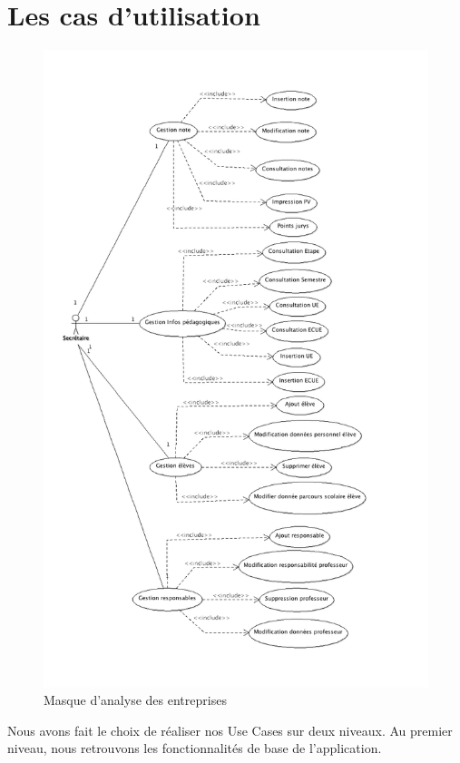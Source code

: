 \documentclass[letter, 12pt] {article}
\begin{document}
	\section{Les cas d'utilisation}
	
	\begin{figure}[htbp]
		\centering
			\includegraphics[scale = 0.5]{../Use_Case/Diagramme_Use_Case.png}
		\caption{Masque d'analyse des entreprises}
	\end{figure}
	
	\newpage
	
	Nous avons fait le choix de réaliser nos Use Cases sur deux niveaux. Au premier niveau, nous retrouvons les fonctionnalités de base de l'application. 
	
\end{document}
